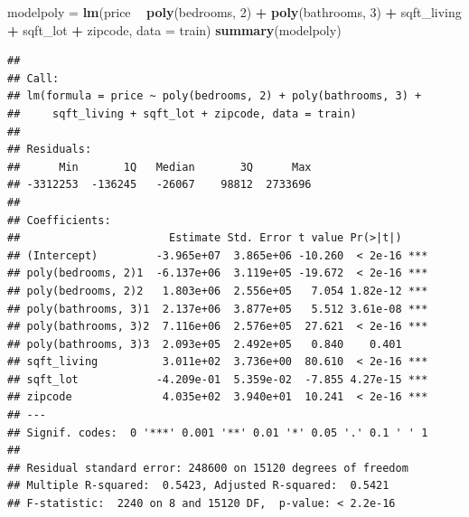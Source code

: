 \documentclass[
]{article}
\newenvironment{Shaded}{\begin{snugshade}}{\end{snugshade}}
\newcommand{\DataTypeTok}[1]{\textcolor[rgb]{0.13,0.29,0.53}{#1}}
\newcommand{\DecValTok}[1]{\textcolor[rgb]{0.00,0.00,0.81}{#1}}
\newcommand{\KeywordTok}[1]{\textcolor[rgb]{0.13,0.29,0.53}{\textbf{#1}}}
\newcommand{\NormalTok}[1]{#1}
\newcommand{\OperatorTok}[1]{\textcolor[rgb]{0.81,0.36,0.00}{\textbf{#1}}}
\newcommand{\StringTok}[1]{\textcolor[rgb]{0.31,0.60,0.02}{#1}}
\begin{document}
\begin{Shaded}
\begin{Highlighting}[]
\NormalTok{modelpoly =}\StringTok{ }\KeywordTok{lm}\NormalTok{(price }\OperatorTok{~}\StringTok{ }\KeywordTok{poly}\NormalTok{(bedrooms, }\DecValTok{2}\NormalTok{) }\OperatorTok{+}\StringTok{ }\KeywordTok{poly}\NormalTok{(bathrooms, }\DecValTok{3}\NormalTok{) }\OperatorTok{+}\StringTok{ }\NormalTok{sqft_living }\OperatorTok{+}\StringTok{ }\NormalTok{sqft_lot }\OperatorTok{+}\StringTok{ }\NormalTok{zipcode, }\DataTypeTok{data =}\NormalTok{ train)}
\KeywordTok{summary}\NormalTok{(modelpoly)}
\end{Highlighting}
\end{Shaded}

\begin{verbatim}
## 
## Call:
## lm(formula = price ~ poly(bedrooms, 2) + poly(bathrooms, 3) + 
##     sqft_living + sqft_lot + zipcode, data = train)
## 
## Residuals:
##      Min       1Q   Median       3Q      Max 
## -3312253  -136245   -26067    98812  2733696 
## 
## Coefficients:
##                       Estimate Std. Error t value Pr(>|t|)    
## (Intercept)         -3.965e+07  3.865e+06 -10.260  < 2e-16 ***
## poly(bedrooms, 2)1  -6.137e+06  3.119e+05 -19.672  < 2e-16 ***
## poly(bedrooms, 2)2   1.803e+06  2.556e+05   7.054 1.82e-12 ***
## poly(bathrooms, 3)1  2.137e+06  3.877e+05   5.512 3.61e-08 ***
## poly(bathrooms, 3)2  7.116e+06  2.576e+05  27.621  < 2e-16 ***
## poly(bathrooms, 3)3  2.093e+05  2.492e+05   0.840    0.401    
## sqft_living          3.011e+02  3.736e+00  80.610  < 2e-16 ***
## sqft_lot            -4.209e-01  5.359e-02  -7.855 4.27e-15 ***
## zipcode              4.035e+02  3.940e+01  10.241  < 2e-16 ***
## ---
## Signif. codes:  0 '***' 0.001 '**' 0.01 '*' 0.05 '.' 0.1 ' ' 1
## 
## Residual standard error: 248600 on 15120 degrees of freedom
## Multiple R-squared:  0.5423, Adjusted R-squared:  0.5421 
## F-statistic:  2240 on 8 and 15120 DF,  p-value: < 2.2e-16
\end{verbatim}

\begin{Shaded}
\end{Shaded}
\end{document}
